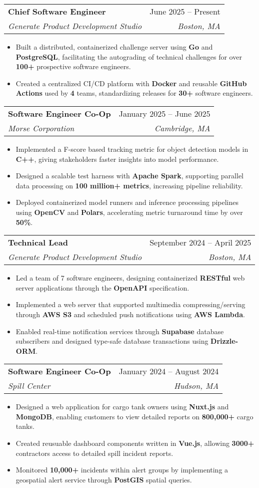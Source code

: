 \documentclass[letterpaper,11pt]{article}
\makeatletter
\newcommand{\resumeItem}[1]{
  \item\small{
    {#1 \vspace{-2pt}}
  }
}
\newcommand{\resumeSubheading}[4]{
  \vspace{-2pt}\item
    \begin{tabular*}{0.97\textwidth}[t]{l@{\extracolsep{\fill}}r}
      \textbf{#1} & #2 \\
      \textit{\small#3} & \textit{\small #4} \\
    \end{tabular*}\vspace{-7pt}
}
\newcommand{\resumeSubSubheading}[2]{
    \item
    \begin{tabular*}{0.97\textwidth}{l@{\extracolsep{\fill}}r}
      \textit{\small#1} & \textit{\small #2} \\
    \end{tabular*}\vspace{-7pt}
}
\newcommand{\resumeSubHeadingListEnd}{\end{itemize}}
\newcommand{\resumeItemListStart}{\begin{itemize}}
\newcommand{\resumeItemListEnd}{\end{itemize}\vspace{-5pt}}
\makeatother
\begin{document}
\resumeSubheading
{Chief Software Engineer}{June 2025 -- Present}
{Generate Product Development Studio}{Boston, MA}
\resumeItemListStart
\resumeItem { Built a distributed, containerized challenge server using \textbf{Go} and \textbf{PostgreSQL}, facilitating the autograding of technical challenges for over \textbf{100+} prospective software engineers. }
\resumeItem { Created a centralized CI/CD platform with \textbf{Docker} and reusable \textbf{GitHub Actions} used by \textbf{4} teams, standardizing releases for \textbf{30+} software engineers. }
\resumeItemListEnd

\resumeSubheading
{Software Engineer Co-Op}{January 2025 -- June 2025}
{Morse Corporation}{Cambridge, MA}
\resumeItemListStart
\resumeItem { Implemented a  F-score based tracking metric for object detection models in \textbf{C++}, giving stakeholders faster insights into model performance. }
\resumeItem { Designed a scalable test harness with \textbf{Apache Spark}, supporting parallel data processing on \textbf{100 million+ metrics}, increasing pipeline reliability.}
\resumeItem { Deployed containerized model runners and inference processing pipelines using \textbf{OpenCV} and \textbf{Polars}, accelerating metric turnaround time by over \textbf{50\%}. }
\resumeItemListEnd


\resumeSubheading
{Technical Lead}{September 2024 -- April 2025}
{Generate Product Development Studio}{Boston, MA}
\resumeItemListStart
\resumeItem { Led a team of 7 software engineers, designing containerized \textbf{RESTful} web server applications through the \textbf{OpenAPI} specification.}
\resumeItem{
	Implemented a web server that supported multimedia compressing/serving through \textbf{AWS S3} and scheduled push notifications using \textbf{AWS Lambda}.
}
\resumeItem { Enabled real-time notification services through \textbf{Supabase} database subscribers and designed type-safe database transactions using \textbf{Drizzle-ORM}.}
\resumeItemListEnd

\resumeSubheading
{Software Engineer Co-Op}{January 2024 -- August 2024}
{Spill Center}{Hudson, MA}
\resumeItemListStart
\resumeItem { Designed a web application for cargo tank owners using \textbf{Nuxt.js} and \textbf{MongoDB}, enabling customers to view detailed reports on \textbf{800,000+} cargo tanks. }
\resumeItem { Created reusuable dashboard components written in \textbf{Vue.js}, allowing \textbf{3000+} contractors access to detailed spill incident reports.   }
\resumeItem { Monitored \textbf{10,000+} incidents within alert groups by implementing a geospatial alert service through \textbf{PostGIS} spatial queries. }
\resumeItemListEnd
\end{document}
